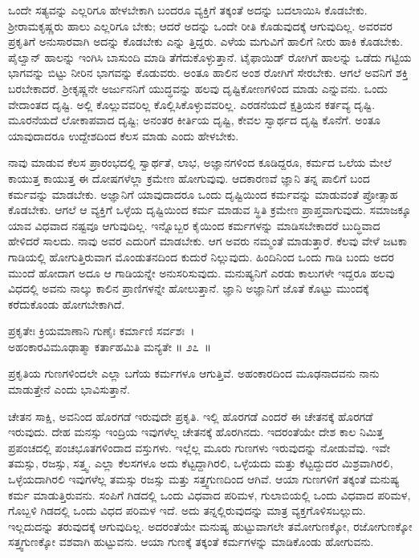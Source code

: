 ಒಂದೇ ಸತ್ಯವನ್ನು ಎಲ್ಲರಿಗೂ ಹೇಳಬೇಕಾಗಿ ಬಂದರೂ ವ್ಯಕ್ತಿಗೆ ತಕ್ಕಂತೆ ಅದನ್ನು ಬದಲಾಯಿಸಿ ಕೊಡಬೇಕು. ಶ‍್ರೀರಾಮಕೃಷ್ಣರು ಹಾಲು ಎಲ್ಲರಿಗೂ ಬೇಕು; ಆದರೆ ಅದನ್ನು ಒಂದೇ ರೀತಿ ಕೊಡುವುದಕ್ಕೆ ಆಗುವುದಿಲ್ಲ. ಅವರವರ ಪ್ರಕೃತಿಗೆ ಅನುಸಾರವಾಗಿ ಅದನ್ನು ಕೊಡಬೇಕು ಎನ್ನು ತ್ತಿದ್ದರು. ಎಳೆಯ ಮಗುವಿಗೆ ಹಾಲಿಗೆ ನೀರು ಹಾಕಿ ಕೊಡಬೇಕು. ಪೈಲ್ವಾನ್ ಹಾಲನ್ನು ಇಂಗಿಸಿ ಬಾಸುಂದಿ ಮಾಡಿ ತೆಗೆದುಕೊಳ್ಳುತ್ತಾನೆ. ಟೈಫಾಯಿಡ್ ರೋಗಿಗೆ ಹಾಲನ್ನು ಒಡೆದು ಗಟ್ಟಿಯ ಭಾಗವನ್ನು ಬಿಟ್ಟು ನೀರಿನ ಭಾಗವನ್ನು ಕೊಡುವರು. ಅಂತೂ ಹಾಲಿನ ಅಂಶ ರೋಗಿಗೆ ಸೇರಬೇಕು. ಆಗಲೆ ಅವನಿಗೆ ಶಕ್ತಿ ಬರಬೇಕಾದರೆ. ಶ‍್ರೀಕೃಷ್ಣನೇ ಅರ್ಜುನನಿಗೆ ಯುದ್ಧವನ್ನು ಹಲವು ದೃಷ್ಟಿಕೋಣಗಳಿಂದ ಮಾಡು ಎನ್ನುವನು. ಒಂದು ವೇದಾಂತದ ದೃಷ್ಟಿ. ಅಲ್ಲಿ ಕೊಲ್ಲುವವರಿಲ್ಲ ಕೊಲ್ಲಿಸಿಕೊಳ್ಳುವವರಿಲ್ಲ. ಎರಡನೆಯದೆ ಕ್ಷತ್ರಿಯನ ಕರ್ತವ್ಯ ದೃಷ್ಟಿ. ಮೂರನೆಯದೆ ಲೋಕಾಪವಾದ ದೃಷ್ಟಿ; ಅನಂತರ ಕೀರ್ತಿಯ ದೃಷ್ಟಿ, ಕೇವಲ ಸ್ವಾರ್ಥದ ದೃಷ್ಟಿ ಕೊನೆಗೆ. ಅಂತೂ ಯಾವುದಾದರೂ ಉದ್ದೇಶದಿಂದ ಕೆಲಸ ಮಾಡು ಎಂದು ಹೇಳಬೇಕು.

ನಾವು ಮಾಡುವ ಕೆಲಸ ಪ್ರಾರಂಭದಲ್ಲಿ ಸ್ವಾರ್ಥತೆ, ಲಾಭ, ಅಜ್ಞಾನಗಳಿಂದ ಕೂಡಿದ್ದರೂ, ಕರ್ಮದ ಒಲೆಯ ಮೇಲೆ ಕಾಯುತ್ತ ಕಾಯುತ್ತ ಈ ದೋಷಗಳೆಲ್ಲಾ ಕ್ರಮೇಣ ಹೋಗುವುವು. ಆದಕಾರಣವೆ ಜ್ಞಾನಿ ತನ್ನ ಪಾಲಿಗೆ ಬಂದ ಕರ್ಮವನ್ನು ಮಾಡಬೇಕು. ಅಜ್ಞಾನಿಗೆ ಯಾವುದಾದರೂ ಒಂದು ದೃಷ್ಟಿಯಿಂದ ಕರ್ಮವನ್ನು ಮಾಡುವಂತೆ ಪ್ರೋತ್ಸಾಹ ಕೊಡಬೇಕು. ಆಗಲೆ ಆ ವ್ಯಕ್ತಿಗೆ ಒಳ್ಳೆಯ ದೃಷ್ಟಿಯಿಂದ ಕರ್ಮ ಮಾಡುವ ಸ್ಥಿತಿ ಕ್ರಮೇಣ ಪ್ರಾಪ್ತವಾಗುವುದು. ಸಮಾಜಕ್ಕೂ ಯಾವ ವಿಧವಾದ ನಷ್ಟವೂ ಆಗುವುದಿಲ್ಲ. ಇನ್ನೊಬ್ಬರ ಕೈಯಿಂದ ಕರ್ಮಗಳನ್ನು ಮಾಡಿಸಬೇಕಾದರೆ ಬುದ್ಧಿವಾದ ಹೇಳಿದರೆ ಸಾಲದು. ನಾವು ಅವರ ಎದುರಿಗೆ ಮಾಡಬೇಕು. ಆಗ ಅವರು ನಮ್ಮಂತೆ ಮಾಡುತ್ತಾರೆ. ಕೆಲವು ವೇಳೆ ಜಟಕಾ ಗಾಡಿಯಲ್ಲಿ ಹೋಗುತ್ತಿರುವಾಗ ಮೊಂಡುತನದಿಂದ ಕುದುರೆ ನಿಲ್ಲುವುದು. ಹಿಂದಿನಿಂದ ಒಂದು ಗಾಡಿ ಬಂದು ಅದರ ಮುಂದೆ ಹೋದಾಗ ಅದೂ ಆ ಗಾಡಿಯನ್ನೇ ಅನುಸರಿಸುವುದು. ಮನುಷ್ಯನಿಗೆ ಎರಡು ಕಾಲುಗಳೇ ಇದ್ದರೂ ಹಲವು ವಿಧದಲ್ಲಿ ಅವನು ನಾಲ್ಕು ಕಾಲಿನ ಪ್ರಾಣಿಗಳನ್ನೇ ಹೋಲುತ್ತಾನೆ. ಜ್ಞಾನಿ ಅಜ್ಞಾನಿಗೆ ಜೊತೆ ಕೊಟ್ಟು ಮುಂದಕ್ಕೆ ಕರೆದುಕೊಂಡು ಹೋಗಬೇಕಾಗಿದೆ.

\begin{shloka}
ಪ್ರಕೃತೇಃ ಕ್ರಿಯಮಾಣಾನಿ ಗುಣೈಃ ಕರ್ಮಾಣಿ ಸರ್ವಶಃ~।\\ಅಹಂಕಾರವಿಮೂಢಾತ್ಮಾ ಕರ್ತಾಹಮಿತಿ ಮನ್ಯತೇ \hfill॥ ೨೭~॥
\end{shloka}

\begin{artha}
ಪ್ರಕೃತಿಯ ಗುಣಗಳಿಂದಲೇ ಎಲ್ಲಾ ಬಗೆಯ ಕರ್ಮಗಳೂ ಆಗುತ್ತಿವೆ. ಅಹಂಕಾರದಿಂದ ಮೂಢ\-ನಾದವನು ನಾನು ಮಾಡುತ್ತೇನೆ ಎಂದು ಭಾವಿಸುತ್ತಾನೆ.
\end{artha}

ಚೇತನ ಸಾಕ್ಷಿ, ಅವನಿಂದ ಹೊರಗಡೆ ಇರುವುದೇ ಪ್ರಕೃತಿ. ಇಲ್ಲಿ ಹೊರಗಡೆ ಎಂದರೆ ಈ ಚೇತನಕ್ಕೆ ಹೊರಗಡೆ ಇರುವುದು. ದೇಹ ಮನಸ್ಸು ಇಂದ್ರಿಯ ಇವುಗಳೆಲ್ಲ ಚೇತನಕ್ಕೆ ಹೊರಗಿನದು. ಇದರಂತೆಯೇ ದೇಶ ಕಾಲ ನಿಮಿತ್ತ ಪ್ರಪಂಚದಲ್ಲಿ ಪಂಚಭೂತಗಳಿಂದಾದ ವಸ್ತುಗಳು. ಇಲ್ಲೆಲ್ಲ ಮೂರು ಗುಣಗಳು ಇರುವುದನ್ನು ನೋಡುವೆವು. ಇವೇ ತಮಸ್ಸು, ರಜಸ್ಸು, ಸತ್ತ್ವ. ಎಲ್ಲಾ ಕೆಲಸಗಳೂ ಅದು ಕೆಟ್ಟದ್ದಾಗಿರಲಿ, ಒಳ್ಳೆಯದು ಮತ್ತು ಕೆಟ್ಟದ್ದುದರ ಮಿಶ್ರವಾಗಿರಲಿ, ಒಳ್ಳೆಯದಾಗಿರಲಿ ಇವುಗಳೆಲ್ಲ ತಮಸ್ಸು ರಜಸ್ಸು ಮತ್ತು ಸತ್ತ್ವಗುಣದಿಂದ ಆಗಿವೆ. ಆಯಾ ಗುಣಗಳಿಗೆ ತಕ್ಕಂತೆ ಮನುಷ್ಯ ಕರ್ಮ ಮಾಡುತ್ತಿರುವನು. ಸಂಪಿಗೆ ಗಿಡದಲ್ಲಿ ಒಂದು ವಿಧವಾದ ಪರಿಮಳ, ಗುಲಾಬಿಯಲ್ಲಿ ಒಂದು ವಿಧವಾದ ಪರಿಮಳ, ಗೊಬ್ಬಳಿ ಗಿಡದಲ್ಲಿ ಒಂದು ವಿಧದ ಪರಿಮಳ ಇದೆ. ಅದು ತನ್ನಲ್ಲಿರುವುದನ್ನು ಮಾತ್ರ ವ್ಯಕ್ತಗೊಳಿಸಬಲ್ಲುದು. ಇಲ್ಲದುದನ್ನು ತರುವುದಕ್ಕೆ ಆಗುವುದಿಲ್ಲ. ಅದರಂತೆಯೇ ಮನುಷ್ಯ ಹುಟ್ಟುವಾಗಲೇ ತಮೋಗುಣಕ್ಕೋ, ರಜೋಗುಣಕ್ಕೋ ಸತ್ತ್ವಗುಣಕ್ಕೋ ವಶವಾಗಿ ಹುಟ್ಟುವನು. ಆಯಾ ಗುಣಕ್ಕೆ ತಕ್ಕಂತೆ ಕರ್ಮಗಳನ್ನು ಮಾಡಿಕೊಂಡು ಹೋಗುವನು.

